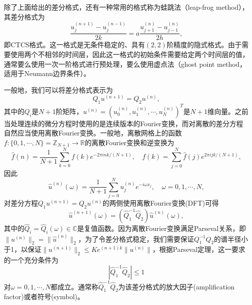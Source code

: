 \documentclass[a4paper,10pt]{ctexart}
\begin{document}
除了上面给出的差分格式，还有一种常用的格式称为蛙跳法（leap-frog method），其差分格式为
\begin{equation}
    \frac{u^{(n+1)}_j-u^{(n-1)}_j}{2k} = a\frac{u^{(n)}_{j+1}-u^{(n)}_{j-1}}{2h},
\end{equation}
即CTCS格式。这一格式是无条件稳定的、具有$ (2,2) $阶精度的隐式格式。由于需要使用两个不相邻的时间层，因此这一格式的初始条件需要给定两个时间层的值，通常要么使用一次一阶格式进行预处理，要么使用虚点法（ghost point method，适用于Neumann边界条件）。

一般地，我们可以将差分格式表示为
\begin{equation}
    Q_1 u^{(n+1)} = Q_2 u^{(n)},
\end{equation}
其中的$ Q_i $是$ N+1 $阶矩阵，$ u^{(n)} = (u^{(n)}_0,u^{(n)}_1,\cdots ,u^{(n)}_N)^T $是$ N+1 $维向量。之前当处理连续的微分方程时使用的是连续版本的Fourier变换，而对离散的差分方程自然应当使用离散Fourier变换。一般地，离散网格上的函数$ f:\{0,1,\cdots ,N\} = \mathbb{Z}_{N+1}\to \mathbb{R} $的离散Fourier变换和逆变换为
\begin{equation}
    \hat{f}(n) = \frac{1}{N+1}\sum_{k=0}^{N} f(k)e^{-2\pi i n k/(N+1)},\quad f(k) = \sum_{j=0}^{N} \hat{f}(j)e^{2\pi ijk/(N+1)},
\end{equation}
因此
\[
    \hat{u}^{(n)}(\omega) = \frac{1}{N+1}\sum_{j=0}^{N} u^{(n)}_j e^{- i \omega x_j},\quad \omega=0,1,\cdots ,N,
\]
对差分方程$ Q_1 u^{(n+1)} = Q_2 u^{(n)} $的两侧使用离散Fourier变换(DFT)可得
\begin{equation}
    \hat{u}^{(n+1)}(\omega) = (\hat{Q}_1^{-1}\hat{Q}_{2})\hat{u}^{(n)}(\omega),
\end{equation}
其中的$ \hat{Q}_i=\hat{Q}_i(\omega)\in \mathbb{C} $是复值函数。因为离散Fourier变换满足Parseval关系，即$ \| u^{(n)} \|_2 = \| \hat{u}^{(n)} \|_2 $，为了令差分格式稳定，我们需要保证$ Q_1^{-1}Q_{2} $的谱半径小于1，以保证$ \| u^{(n+1)} \|_2 \leqslant K e^{(n+1)k}\| u^{(n)} \| $，根据Parseval定理，这一要求的一个充分条件为
\begin{equation}
    |\hat{Q}_1^{-1}\hat{Q}_{2}|\leqslant 1
\end{equation}
对$ \omega = 0,1,\cdots ,N $都成立。通常称$ \hat{Q}_1^{-1}\hat{Q}_{2} $为该差分格式的放大因子(amplification factor)或者符号(symbol)。
\end{document}
